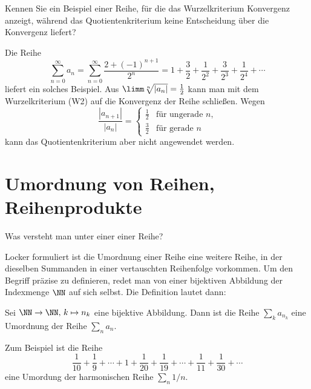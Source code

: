 \begin{frage}\label{02_wurzb}
  Kennen Sie ein Beispiel einer Reihe, für die das Wurzelkriterium Konvergenz 
  anzeigt, während das Quotientenkriterium keine Entscheidung über die 
  Konvergenz liefert?
\end{frage}

\begin{antwort}
  Die Reihe 
  \[
  \sum_{n=0}^\infty a_n = \sum_{n=0}^\infty \frac{2+(-1)^{n+1}}{2^n} 
  = 1+\frac{3}{2} +\frac{1}{2^2} +\frac{3}{2^3} +\frac{1}{2^4} + \cdots  
  \]
  liefert ein solches Beispiel. Aus 
  $\limm \sqrt[n]{|a_n|}=\frac{1}{2}$ 
  kann man mit dem Wurzelkriterium (W2)
  auf die Konvergenz der Reihe schließen. Wegen 
  \[
  \frac{|a_{n+1}|}{|a_n|} = \left\{ \begin{array}{ll}
      \frac{1}{2} & \text{für ungerade $n$,} \\
      \frac{3}{2} & \text{für gerade $n$}
    \end{array} \right.
  \]
  kann das Quotientenkriterium aber nicht angewendet werden. \AntEnd
\end{antwort}


\section{Umordnung von Reihen, Reihenprodukte}\label{umordnung}

\begin{frage}\label{02_umo}
  Was versteht man unter einer  einer Reihe?
\end{frage}

\begin{antwort}
  Locker formuliert ist die Umordnung einer Reihe eine weitere 
  Reihe, in der dieselben 
  Summanden in einer vertauschten Reihenfolge vorkommen. Um den Begriff 
  präzise zu definieren, redet man von einer bijektiven Abbildung 
  der Indexmenge $\NN$ auf sich selbst. Die Definition lautet dann: 

  \medskip\noindent
  Sei $\NN\to \NN,\, k\mapsto n_k$ eine bijektive Abbildung. 
  Dann ist die Reihe $\sum_k a_{n_k}$ eine Umordnung der Reihe 
  $\sum_n a_n$.

  \medskip\noindent
  Zum Beispiel ist die Reihe 
  \[
  \frac{1}{10}+\frac{1}{9}+\cdots + 1 + \frac{1}{20}+\frac{1}{19} + 
  \cdots +\frac{1}{11}+\frac{1}{30}+\cdots 
  \]
  eine Umordung der harmonischen Reihe $\sum_n 1/n$.
  \AntEnd
\end{antwort}

